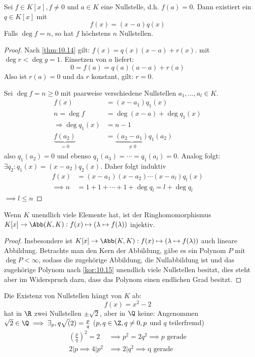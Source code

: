 \documentclass{mycourse}
\begin{document}
\begin{kor}
\label{kor:10.15}
Sei $f\in K[x], f\neq 0$ und $a\in K$ eine Nullstelle, d.h. $f(a)=0$.
Dann existiert ein $q\in K[x]$ mit
\[
f(x) = (x-a)q(x)
\]
Falls $\deg f= n$, so hat $f$ höchstens $n$ Nullstellen.
\begin{proof}
Nach \ref{thm:10.14} gilt: $f(x)=q(x)(x-a)+r(x)$.
mit $\deg r < \deg g = 1$.
Einsetzen von $a$ liefert:
\[
0=f(a)=q(a)(a-a)+r(a)
\]
Also ist $r(a)=0$ und da $r$ konstant, gilt: $r=0$.

Sei $\deg f=n\ge 0$ mit paarweise verschiedene Nullstellen $a_1,\dotsc,a_l\in K$.
\begin{align*}
f(x)&=(x-a_1)q_1(x)\\
n= \deg f &= \deg(x-a) +\deg q_1(x)\\
\Rightarrow \deg q_1(x) &=n-1\\
\underbrace{f (a_2)}_{=0} &=\underbrace{(a_2-a_1)}_{\neq 0}q_1(a_2)
\end{align*}
also $q_1(a_2) = 0$ und ebenso $q_1(a_3)=\dotsb=q_1(a_l)=0$.
Analog folgt: $\exists{q_2}: q_1(x)=(x-a_2) q_2(x)$.
Daher folgt induktiv
\begin{align*}
f(x)&=(x-a_1)(x-a_2)\dotsb (x-a_l)q_l(x)\\
\implies n &= 1 + 1 +\dotsb + 1 + \deg q_l=l+ \deg q_l
\end{align*}
$\implies l\le n$
\end{proof}
\end{kor}

\begin{note} Wenn $K$ unendlich viele Elemente hat, 
ist der Ringhomomorphismus $K[x]\to \Abb(K,K) : f(x)\mapsto (\lambda \mapsto f(\lambda))$ injektiv.

\begin{proof}
Insbesondere ist $K[x]\to \Abb(K,K) : f(x)\mapsto (\lambda \mapsto f(\lambda))$ auch lineare Abbildung.
Betrachte man den Kern der Abbildung, gäbe es ein Polynom $P$ mit $\deg P<\infty$, sodass die zugehörige Abbildung, die 
Nullabbildung ist und das zugehörige Polynom nach \ref{kor:10.15} unendlich viele Nullstellen besitzt, dies steht aber im 
Widerspruch dazu, dass das Polynom einen endlichen Grad besitzt.
\end{proof}
\end{note}

Die Existenz von Nullstellen hängt von $K$ ab:
\[
f(x)=x^2-2
\]
hat in $\R$ zwei Nullstellen $\pm \sqrt{2}$, aber in $\Q$ keine:
Angenommen $\sqrt 2\in \Q \implies \exists_p,q \sqrt(2)=\frac{p}{q}$ ($p, q \in \Z, q \neq 0, p$ und $q$ teilerfremd)
\begin{align*}
\left(\frac pq\right)^2=2
&\implies p^2=2q^2
\implies p \text{ gerade}\\
2 | p \implies 4 | p^2
&\implies 2 | q^2
\implies \text{q gerade}
\end{align*}
\end{document}
